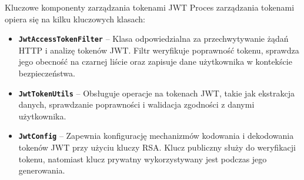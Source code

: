 \noindent Kluczowe komponenty zarządzania tokenami JWT
Proces zarządzania tokenami opiera się na kilku kluczowych klasach:
\begin{itemize}
    \item \textbf{\texttt{JwtAccessTokenFilter}} -- Klasa odpowiedzialna za przechwytywanie żądań HTTP i analizę tokenów JWT. Filtr weryfikuje poprawność tokenu, sprawdza jego obecność na czarnej liście oraz zapisuje dane użytkownika w kontekście bezpieczeństwa.
    \item \textbf{\texttt{JwtTokenUtils}} -- Obsługuje operacje na tokenach JWT, takie jak ekstrakcja danych, sprawdzanie poprawności i walidacja zgodności z danymi użytkownika.
    \item \textbf{\texttt{JwtConfig}} -- Zapewnia konfigurację mechanizmów kodowania i dekodowania tokenów JWT przy użyciu kluczy RSA. Klucz publiczny służy do weryfikacji tokenu, natomiast klucz prywatny wykorzystywany jest podczas jego generowania.
\end{itemize}

